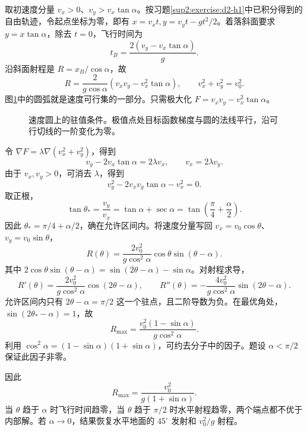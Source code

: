 \begin{solution}
取初速度分量 $v_x>0$、$v_y>v_x\tan\alpha$。按习题\ref{sup2:exercise:d2-h1}中已积分得到的自由轨迹，令起点坐标为零，即有 $x=v_xt,y=v_yt-gt^2/2$。着落斜面要求 $y=x\tan\alpha$，除去 $t=0$，飞行时间为
\[
t_B=\frac{2(v_y-v_x\tan\alpha)}g.
\]
沿斜面射程是 $R=x_B/\cos\alpha$，故
\[
R=\frac{2}{g\cos\alpha}
(v_xv_y-v_x^2\tan\alpha),\qquad v_x^2+v_y^2=v_0^2.
\]
图\ref{sup2:fig:d2-h9-s}中的圆弧就是速度可行集的一部分。只需极大化 $F=v_xv_y-v_x^2\tan\alpha$。

\begin{figure}[H]\centering
{}
\caption{速度圆上的驻值条件。极值点处目标函数梯度与圆的法线平行，沿可行切线的一阶变化为零。}\label{sup2:fig:d2-h9-s}
\end{figure}

令 $\nabla F=\lambda\nabla(v_x^2+v_y^2)$，得到
\[
v_y-2v_x\tan\alpha=2\lambda v_x,
\qquad v_x=2\lambda v_y.
\]
由于 $v_x,v_y>0$，可消去 $\lambda$，得到
\[
v_y^2-2v_xv_y\tan\alpha-v_x^2=0.
\]
取正根，
\[
\tan\theta_* =\frac{v_y}{v_x}
=\tan\alpha+\sec\alpha
=\tan\left(\frac\pi4+\frac\alpha2\right).
\]
因此 $\theta_* =\pi/4+\alpha/2$，确在允许区间内。将速度分量写回 $v_x=v_0\cos\theta$、$v_y=v_0\sin\theta$，
\[
R(\theta)=\frac{2v_0^2}{g\cos^2\alpha}
\cos\theta\sin(\theta-\alpha).
\]
其中 $2\cos\theta\sin(\theta-\alpha)=\sin(2\theta-\alpha)-\sin\alpha$。对射程求导，
\[
R'(\theta)=\frac{2v_0^2}{g\cos^2\alpha}\cos(2\theta-\alpha),
\qquad
R''(\theta)=-\frac{4v_0^2}{g\cos^2\alpha}\sin(2\theta-\alpha).
\]
允许区间内只有 $2\theta-\alpha=\pi/2$ 这一个驻点，且二阶导数为负。在最优角处，$\sin(2\theta_* -\alpha)=1$，故
\[
R_{\max}=\frac{v_0^2(1-\sin\alpha)}{g\cos^2\alpha}.
\]
利用 $\cos^2\alpha=(1-\sin\alpha)(1+\sin\alpha)$，可约去分子中的因子。题设 $\alpha<\pi/2$ 保证此因子非零。

因此
\[
\boxed{R_{\max}=\frac{v_0^2}{g(1+\sin\alpha)}.}
\]
当 $\theta$ 趋于 $\alpha$ 时飞行时间趋零，当 $\theta$ 趋于 $\pi/2$ 时水平射程趋零，两个端点都不优于内部解。若 $\alpha\to0$，结果恢复水平地面的 $45^\circ$ 发射和 $v_0^2/g$ 射程。

\end{solution}


